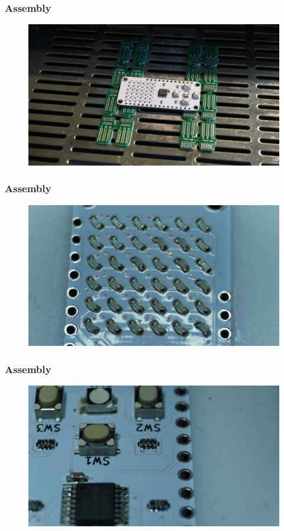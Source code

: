 \documentclass[t]{beamer}
\begin{document}
\begin{frame}
	\frametitle{Assembly}
	\begin{figure}
		\includegraphics[width=\linewidth]{assembly/assm10.JPG}
	\end{figure}
\end{frame}
\begin{frame}
\frametitle{Assembly}
\begin{figure}
	\includegraphics[width=\linewidth]{assembly/assm13.JPG}
\end{figure}
\end{frame}
\begin{frame}
\frametitle{Assembly}
\begin{figure}
	\includegraphics[width=\linewidth]{assembly/assm14.JPG}
\end{figure}
\end{frame}
\end{document}
